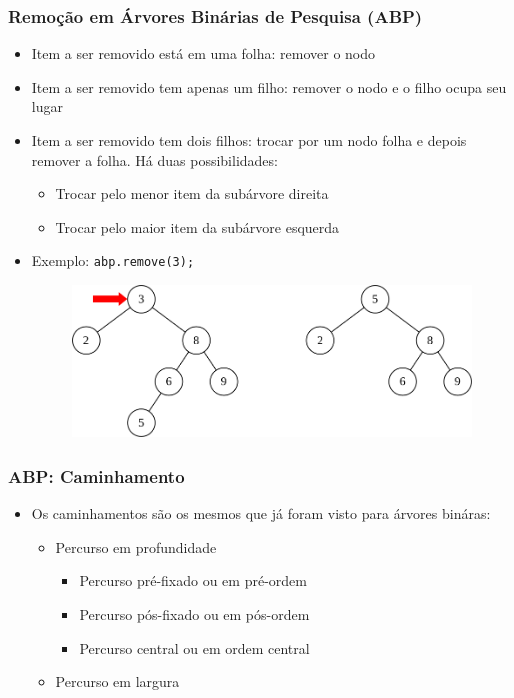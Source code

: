 \documentclass[aspectratio=169]{beamer}
\begin{document}
\begin{frame}\frametitle{Remoção em Árvores Binárias de Pesquisa (ABP)}
\begin{itemize}
	\item Item a ser removido está em uma folha: remover o nodo\\
	\item Item a ser removido tem apenas um filho: remover o nodo e o filho ocupa seu lugar\\
	\item Item a ser removido tem dois filhos: trocar por um nodo folha e depois remover a folha. Há duas possibilidades:\\
	\begin{itemize}
		\item Trocar pelo menor item da subárvore direita\\
		\item Trocar pelo maior item da subárvore esquerda\\
	\end{itemize}
	\item Exemplo: \texttt{abp.remove(3);}\\
\begin{figure}[h]
	\centering
	\includegraphics[height=0.3\paperheight]{imagens/abp-remocao2.png}
\end{figure}
\end{itemize}
\end{frame}

\begin{frame}\frametitle{ABP: Caminhamento}
\begin{itemize}
	\item Os caminhamentos são os mesmos que já foram visto para árvores bináras:
	\begin{itemize}
		\item Percurso em profundidade
		\begin{itemize}
			\item Percurso pré-fixado ou em pré-ordem
			\item Percurso pós-fixado ou em pós-ordem
			\item Percurso central ou em ordem central
		\end{itemize}
		\item Percurso em largura
	\end{itemize}
\end{itemize}
\end{frame}
\end{document}
